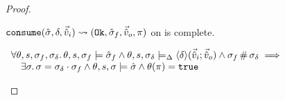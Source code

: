\begin{proof}

\pfassume \begin{hypvlist}
 $\texttt{consume}(\hat{\sigma},\delta,\vec{\hat{v}}_i)\rightsquigarrow (\texttt{Ok},\hat{\sigma}_f,\vec{\hat{v}}_o,\pi)$
 \consume{} on \mmdl{} is complete.
\end{hypvlist}
\pfprove \begin{goalvlist}
 $\begin{array}{l}
\forall \theta,s,\sigma_f,\sigma_\delta\ldotp \theta,s,\sigma_f\models \hat{\sigma}_f \land \theta, s, \sigma_\delta \models_{\Delta} \left<\delta\right>\!(\vec{\hat{v}}_i;\vec{\hat{v}}_o) \land \sigma_f\operatorname{\#}\sigma_\delta \implies \\
\quad \exists \sigma\ldotp \sigma = \sigma_\delta \cdot \sigma_f \land \theta,s,\sigma\models \hat{\sigma} \land \theta(\pi)=\texttt{true}
\end{array}$
\end{goalvlist}

\pfcase{$\delta \in \preds_\mmdl$}


\end{proof}
